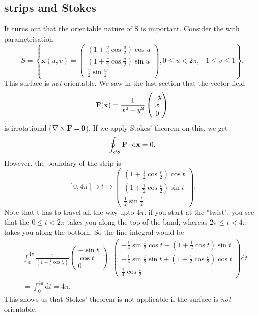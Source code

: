 \subsection{\mobius strips and Stokes}
It turns out that the orientable nature of S is important. Consider the \mobius with parametrisation
\[
    S=\left\{\mathbf{x}(u, v)=\begin{pmatrix}
        \left(1+\frac{v}{2} \cos \frac{u}{2}\right) \cos u \\[5pt]
        \left(1+\frac{v}{2} \cos \frac{u}{2}\right) \sin u \\[5pt]
        \frac{v}{2} \sin \frac{u}{2}
    \end{pmatrix}, 0 \leq u<2 \pi,-1 \leq v \leq 1\right\}.
\]
This surface is \textit{not} orientable. We saw in the last section that the vector field
\[
    {\bf F}({\bf x}) = \frac{1}{x^2+y^2}\begin{pmatrix}
        -y \\ x \\ 0
    \end{pmatrix}
\]
is irrotational ($ \nabla\times {\bf F} = \mathbf{0} $). If we apply Stokes' theorem on this, we get 
\[
    \oint_{\partial S} {\bf F} \cdot \mathrm{d}{\bf x}=0.
\]
However, the boundary of the \mobius strip is 
\[
    [0,4 \pi] \ni t \mapsto \begin{pmatrix}
        \left(1+\frac{1}{2} \cos \frac{t}{2}\right) \cos t \\[5pt]
        \left(1+\frac{1}{2} \cos \frac{t}{2}\right) \sin t \\[5pt]
        \frac{1}{2} \sin \frac{t}{2}
    \end{pmatrix}.
\]
Note that t has to travel all the way upto $4 \pi$: if you start at the "twist", you see that the
$0 \leq t<2 \pi$ takes you along the top of the band, whereas $2 \pi \leq t<4 \pi$ takes you along the bottom. So the line integral would be 
\begin{align*}
    &\int_{0}^{4 \pi} \frac{1}{\left(1+\frac{1}{2} \cos \frac{t}{2}\right)}\begin{pmatrix}
        -\sin t \\ \cos t \\ 0
    \end{pmatrix} \cdot \begin{pmatrix}
        -\frac{1}{4} \sin \frac{t}{2} \cos t-\left(1+\frac{1}{2} \cos t\right) \sin t \\[5pt]
        -\frac{1}{4} \sin \frac{t}{2} \sin t+\left(1+\frac{1}{2} \cos \frac{t}{2}\right) \cos t \\[5pt]
        \frac{1}{4} \cos \frac{t}{2}
    \end{pmatrix} \mathrm{d} t\\
    &=\int_{0}^{4 \pi} \mathrm{d} t=4 \pi.
\end{align*}
This shows us that Stokes' theorem is not applicable if the surface is \textit{not} orientable.